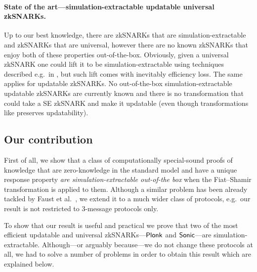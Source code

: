 \let\accentvec\vec \documentclass[runningheads]{llncs}
\begin{document}
\paragraph{State of the art---simulation-extractable updatable universal zkSNARKs.} 
Up to our best knowledge, there are zkSNARKs that are simulation-extractable
and zkSNARKs that are universal, however there are no known zkSNARKs that enjoy
both of these properties out-of-the-box. Obviously, given a universal zkSNARK
one could lift it to be simulation-extractable using techniques described
e.g.~in \cite{EPRINT:KZMQCP15,CCS:AbdRamSla20}, but such lift comes with
inevitably efficiency loss.  
The same applies for updatable zkSNARKs. No out-of-the-box
simulation-extractable updatable zkSNARKs are
currently known and there is no transformation that could take a SE zkSNARK
and make it updatable (even though transformations like \cite{CCS:AbdRamSla20}
preserves updatability).

\subsection{Our contribution}
First of all, we show that a class of computationally special-sound proofs of
knowledge that are zero-knowledge 
in the standard model and have a unique response property \emph{are
  simulation-extractable out-of-the box} when the Fiat--Shamir transformation is
applied to them. Although a similar problem has been already tackled by Faust et
al.~\cite{INDOCRYPT:FKMV12}, we extend it to a much wider class of protocols,
e.g.~our result is not restricted to $3$-message protocols only.

To show that our result is useful and practical we prove that two of the most
efficient updatable and universal zkSNARKs---$\textnormal{\textsf{Plonk}}$ and ${\textnormal{\textsf{Sonic}}}$---are
simulation-extractable. Although---or arguably because---we do not change these
protocols at all, we had to solve a number of problems in order to obtain this
result which are explained below.
\end{document}
